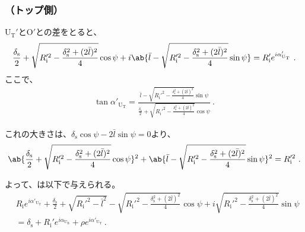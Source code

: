 \subsubsection{\AfterRotatePlateContactPoint（トップ側）}
\AfterRotateReceiverPlateCenter U$_\mathrm T'$と\nameCurvatureCenter O$'$との差をとると、
\begin{align*}
  \frac{\delta_\mathrm s}2+\sqrt{R_\mathrm i'^2-\frac{\delta_\mathrm s^2+(2\bar l)^2}4}\cos\psi
  +i\ab\{\bar l-\sqrt{R_\mathrm i'^2-\frac{\delta_\mathrm s^2+(2\bar l)^2}4}\sin\psi\}
  = R_\mathrm i'e^{i\alpha'_{\mathrm U_\mathrm T}}\ .
\end{align*}
ここで、
\begin{align*}
  \tan\alpha'_{\mathrm U_\mathrm T}
  = \frac{\displaystyle\bar l-\sqrt{R_\mathrm i'^2-\frac{\delta_\mathrm s^2+(2\bar l)^2}4}\sin\psi}
         {\displaystyle\frac{\delta_\mathrm s}2+\sqrt{R_\mathrm i'^2-\frac{\delta_\mathrm s^2+(2\bar l)^2}4}\cos\psi}\ .
\end{align*}
\begin{hosoku}
これの大きさは、$\delta_\mathrm s\cos\psi-2\bar l\sin\psi = 0$より、
\begin{align*}
  \ab\{\frac{\delta_\mathrm s}2+\sqrt{R_\mathrm i'^2-\frac{\delta_\mathrm s^2+(2\bar l)^2}4}\cos\psi\}^2
  +\ab\{\bar l-\sqrt{R_\mathrm i'^2-\frac{\delta_\mathrm s^2+(2\bar l)^2}4}\sin\psi\}^2
  = R_\mathrm i'^2\ .
\end{align*}
\end{hosoku}
よって、\AfterRotatePlateContactPoint は以下で与えられる。
\begin{align*}
  &  R_\mathrm ie^{i\alpha'_{\mathrm U_\mathrm T}}
     +\frac{\delta_\mathrm s}2+\sqrt{R_\mathrm i'^2-\bar l^2}-\sqrt{R_\mathrm i'^2-\frac{\delta_\mathrm s^2+(2\bar l)^2}4}\cos\psi
     +i\sqrt{R_\mathrm i'^2-\frac{\delta_\mathrm s^2+(2\bar l)^2}4}\sin\psi\\
  &= \delta_\mathrm s+R_\mathrm i'e^{i\alpha_{\mathrm U_\mathrm B}}+\rho e^{i\alpha'_{\mathrm U_\mathrm T}}\ .
\end{align*}

